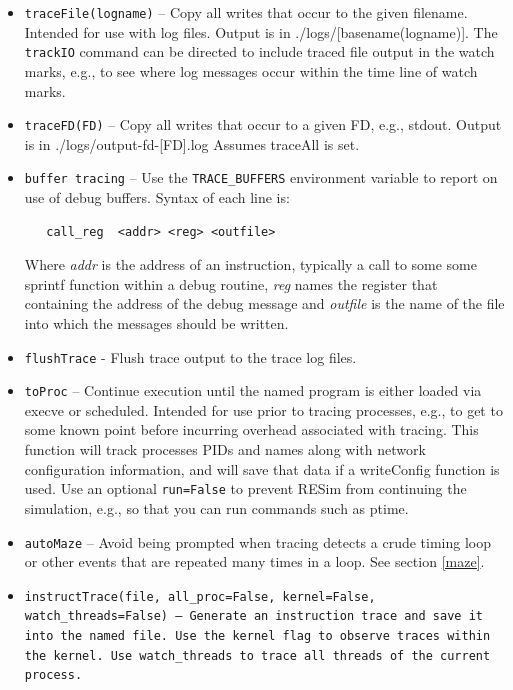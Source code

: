 \documentclass[titlepage]{article}
\begin{document}
\begin{itemize}
\item {\tt traceFile(logname)} – Copy all writes that occur to the given filename.  Intended for use with log files.  Output is in ./logs/[basename(logname)].
The {\tt trackIO} command can be directed to include traced file output in the watch marks, e.g., to see where log messages occur within the
time line of watch marks.

\item {\tt traceFD(FD)} – Copy all writes that occur to a given FD, e.g., stdout.  Output is in ./logs/output-fd-[FD].log   Assumes traceAll is set.

\item {\tt buffer tracing} – Use the {\tt TRACE\_BUFFERS} environment variable to report on use of debug buffers.  Syntax of each line is:
\begin{verbatim}
   call_reg  <addr> <reg> <outfile>
\end{verbatim}
Where \textit{addr} is the address of an instruction, typically a call to some some sprintf function within a debug routine, \textit{reg} names the register that containing the address of the debug message
and \textit{outfile} is the name of the file into which the messages should be written.

\item {\tt flushTrace} - Flush trace output to the trace log files.

\item {\tt toProc} – Continue execution until the named program is either loaded via execve or scheduled.  Intended for use prior to tracing processes, e.g., to get to some known point before incurring overhead associated with tracing.   This function will track processes PIDs and names along with network configuration information, and will save that data if a writeConfig function is used.
Use an optional {\tt run=False} to prevent RESim from continuing the simulation, e.g., so that you can run commands such as ptime.

\item {\tt autoMaze} -- Avoid being prompted when tracing detects a crude timing loop or other events that are repeated many times in a loop.
See section \ref{maze}.

\item {\tt instructTrace(file, all\_proc=False, kernel=False, watch\_threads=False) -- Generate an instruction trace and save it into the named file. Use the kernel
flag to observe traces within the kernel. Use {\tt watch\_threads} to trace all threads of the current process.}
\end{itemize}
\end{document}
